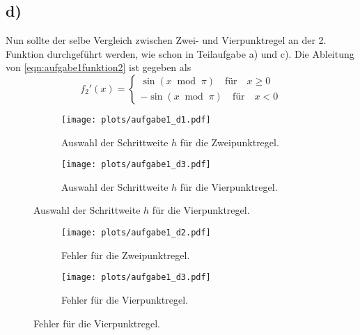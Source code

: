   \subsection{d)}
    Nun sollte der selbe Vergleich zwischen Zwei- und Vierpunktregel an der 2. Funktion durchgeführt werden, wie schon in Teilaufgabe a) und c).
    Die Ableitung von \ref{eqn:aufgabe1funktion2} ist gegeben als
    \begin{equation}
      f_2'(x) = \left\{
        \begin{matrix}
          \sin(x \;\;\text{mod}\;\; \pi) \quad \text{für} \quad x \geq 0 \\[2pt]
          -\sin(x \;\;\text{mod}\;\; \pi) \quad \text{für} \quad x < 0
        \end{matrix}
      \right.
    \end{equation}
    
    \begin{figure}[ht]
      \centering
      \begin{subfigure}{0.49\textwidth}
          \texttt{[image: plots/aufgabe1\_d1.pdf]} \vspace*{-0.6cm}
          \caption{Auswahl der Schrittweite $h$ für die Zweipunktregel.}
          \label{fig:aufgabe1_d1}
      \end{subfigure}
      \hfill
      \begin{subfigure}{0.49\textwidth}
          \texttt{[image: plots/aufgabe1\_d3.pdf]} \vspace*{-0.6cm}
          \caption{Auswahl der Schrittweite $h$ für die Vierpunktregel.}
          \label{fig:aufgabe1_d3}
      \end{subfigure}
      
  \end{figure}
  
  \FloatBarrier

  \begin{figure}[ht]
    \centering
    \begin{subfigure}{0.49\textwidth}
        \texttt{[image: plots/aufgabe1\_d2.pdf]} \vspace*{-0.6cm}
        \caption{Fehler für die Zweipunktregel.}
        \label{fig:aufgabe1_d2}
    \end{subfigure}
    \hfill
    \begin{subfigure}{0.49\textwidth}
        \texttt{[image: plots/aufgabe1\_d3.pdf]} \vspace*{-0.6cm}
        \caption{Fehler für die Vierpunktregel.}
        \label{fig:aufgabe1_d4}
    \end{subfigure}
    
  \end{figure}

\FloatBarrier